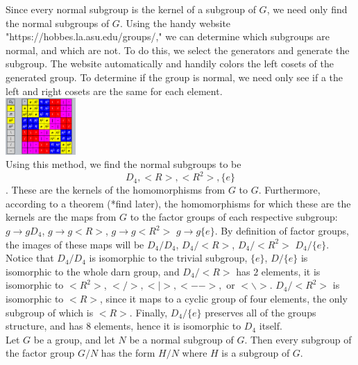 \documentclass{article}
\begin{document}
 Since every normal subgroup is the kernel of a subgroup of $G$, we need only find the normal subgroups of $G$. Using the handy website "https://hobbes.la.asu.edu/groups/," we can determine which subgroups are normal, and which are not. To do this, we select the generators and generate the subgroup. The website automatically and handily colors the left cosets of the generated group. To determine if the group is normal, we need only see if a the left and right cosets are the same for each element.\\ 
\includegraphics[width=0.2\textwidth]{normal_subgroup.png}\\
Using this method, we find the normal subgroups to be 
$$D_4, <R>,<R^2>,\{e\}$$. These are the kernels of the homomorphisms from $G$ to $G$. Furthermore, according to a theorem (*find later), the homomorphisms for which these are the kernels are the maps from $G$ to the factor groups of each respective subgroup: $g\rightarrow gD_4$, $g\rightarrow g<R>$, $g\rightarrow g<R^2>$ $g\rightarrow g\{e\}$. By definition of factor groups, the images of these maps will be $D_4/D_4$, $D_4/<R>$, $D_4/<R^2>$ $D_4/\{e\}$. \\

Notice that $D_4/D_4$ is isomorphic to the trivial subgroup, $\{e\}$, $D/\{e\}$ is isomorphic to the whole darn group, and $D_4/<R>$ has $2$ elements, it is isomorphic to $<R^2>$, $</>,<|>,<-->,$ or $<\backslash >$. $D_4/<R^2>$ is isomorphic to $<R>$, since it maps to a cyclic group of four elements, the only subgroup of which is $<R>$. Finally, $D_4/\{e\}$ preserves all of the groups structure, and has 8 elements, hence it is isomorphic to $D_4$ itself.\\

 Let $G$ be a group, and let $N$ be a normal subgroup of $G$. Then every subgroup of the factor group $G/N$ has the form $H/N$ where $H$ is a subgroup of $G$. \\
\end{document}
